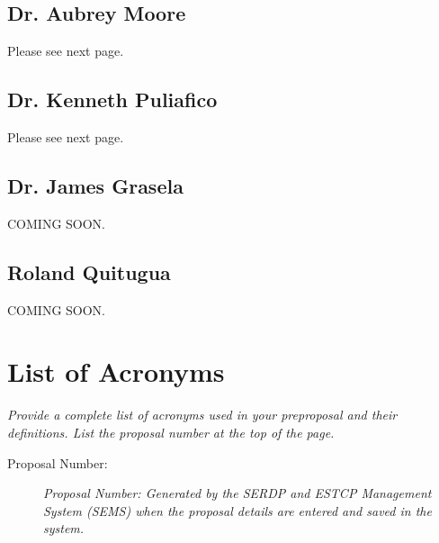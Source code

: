 \documentclass[11pt,english,letterpaper]{scrartcl}
\begin{document}
\subsection{Dr. Aubrey Moore}
Please see next page.


\subsection{Dr. Kenneth Puliafico}
Please see next page.


\subsection{Dr. James Grasela}
COMING SOON.

\subsection{Roland Quitugua}
COMING SOON.

%

\section{List of Acronyms}

\textit{Provide a complete list of acronyms used in your preproposal and their definitions. List the proposal number at the top of the page.}

\begin{description}
	\item[Proposal Number:] \emph{Proposal Number: Generated by the SERDP and ESTCP Management System
	(SEMS) when the proposal details are entered and saved in the system.}
\end{description}
\end{document}
